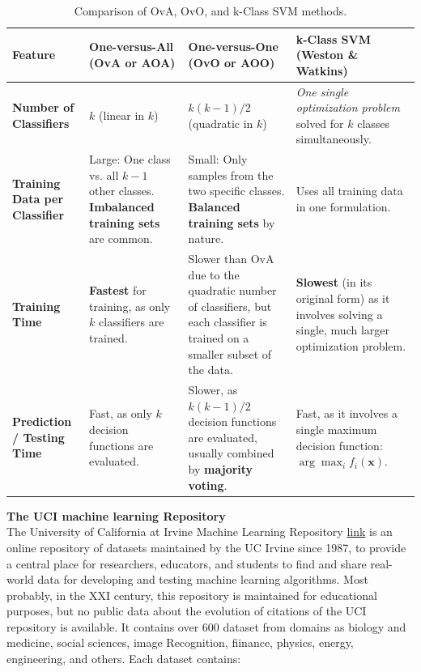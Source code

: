 \documentclass[11pt]{article}
\begin{document}
	\begin{table}[h!]
		\centering
		\renewcommand{\arraystretch}{1.28}
		
		\begin{tabularx}{\textwidth}{p{2.8cm}|X|X|X}
			\textbf{Feature} &
			\textbf{One-versus-All (OvA or AOA)} &
			\textbf{One-versus-One (OvO or AOO)} &
			\textbf{k-Class SVM (Weston \& Watkins)} \\ \hline
			
			\textbf{Number of Classifiers} &
			$k$ (linear in $k$) &
			$k(k-1)/2$ (quadratic in $k$) &
			\textit{One single optimization problem} solved for $k$ classes simultaneously. \\
			
			\textbf{Training Data per Classifier} &
			Large: One class vs. all $k-1$ other classes. \textbf{Imbalanced training sets} are common. &
			Small: Only samples from the two specific classes. \textbf{Balanced training sets} by nature. &
			Uses all training data in one formulation. \\
			
			\textbf{Training Time} &
			\textbf{Fastest} for training, as only $k$ classifiers are trained. &
			Slower than OvA due to the quadratic number of classifiers, but each classifier is trained on a smaller subset of the data. &
			\textbf{Slowest} (in its original form) as it involves solving a single, much larger optimization problem. \\
			
			\textbf{Prediction / Testing Time} &
			Fast, as only $k$ decision functions are evaluated. &
			Slower, as $k(k-1)/2$ decision functions are evaluated, usually combined by \textbf{majority voting}. &
			Fast, as it involves a single maximum decision function: $\arg\max_i f_i(\mathbf{x})$. \\
			
		\end{tabularx}
		
		\caption{Comparison of OvA, OvO, and k-Class SVM methods.}
		\label{tab:svm_comparison}
	\end{table}

	\textbf{The UCI machine learning Repository}\\
	
	The University of California at Irvine Machine Learning Repository \href{https://archive.ics.uci.edu/}{link} is an online repository of datasets maintained by the UC Irvine since 1987, to provide a central place for researchers, educators, and students to find and share real-world data for developing and testing machine learning algorithms. Most probably, in the XXI century, this repository is maintained for educational purposes, but no public data about the evolution of citations of the UCI repository is available. It contains over 600 dataset from domains as biology and medicine, social sciences, image Recognition, fiinance, physics, energy, engineering, and others. Each dataset contains: 
	
\end{document}

